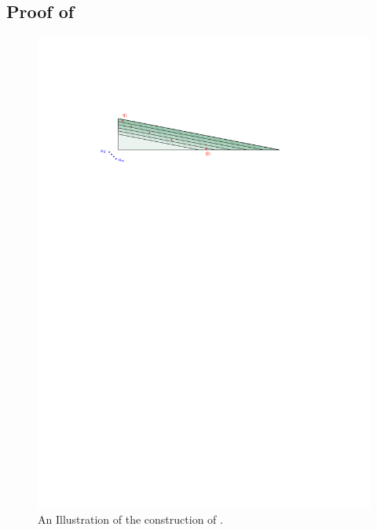 \subsection{Proof of }

%
{%
	\LemmaTriangleLowerBound{}
}

\begin{figure}[h]
	\centering \includegraphics{figs/triangle_lower_bound}
	\caption{An Illustration of the construction of 
		.}
\end{figure}

